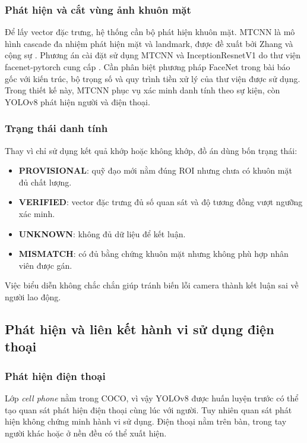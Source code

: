 \subsubsection{Phát hiện và cắt vùng ảnh khuôn mặt}
Để lấy vector đặc trưng, hệ thống cần bộ phát hiện khuôn mặt. MTCNN là mô hình cascade đa nhiệm phát hiện mặt và landmark, được đề xuất bởi Zhang và cộng sự \cite{mtcnn}. Phương án cài đặt sử dụng MTCNN và InceptionResnetV1 do thư viện facenet-pytorch cung cấp \cite{facenetpytorch}. Cần phân biệt phương pháp FaceNet trong bài báo gốc với kiến trúc, bộ trọng số và quy trình tiền xử lý của thư viện được sử dụng. Trong thiết kế này, MTCNN phục vụ xác minh danh tính theo sự kiện, còn YOLOv8 phát hiện người và điện thoại.

\subsubsection{Trạng thái danh tính}
Thay vì chỉ sử dụng kết quả khớp hoặc không khớp, đồ án dùng bốn trạng thái:
\begin{itemize}
\item \textbf{PROVISIONAL}: quỹ đạo mới nằm đúng ROI nhưng chưa có khuôn mặt đủ chất lượng.
\item \textbf{VERIFIED}: vector đặc trưng đủ số quan sát và độ tương đồng vượt ngưỡng xác minh.
\item \textbf{UNKNOWN}: không đủ dữ liệu để kết luận.
\item \textbf{MISMATCH}: có đủ bằng chứng khuôn mặt nhưng không phù hợp nhân viên được gán.
\end{itemize}
Việc biểu diễn không chắc chắn giúp tránh biến lỗi camera thành kết luận sai về người lao động.

\subsection{Phát hiện và liên kết hành vi sử dụng điện thoại}
\subsubsection{Phát hiện điện thoại}
Lớp \textit{cell phone} nằm trong COCO, vì vậy YOLOv8 được huấn luyện trước có thể tạo quan sát phát hiện điện thoại cùng lúc với người. Tuy nhiên quan sát phát hiện không chứng minh hành vi sử dụng. Điện thoại nằm trên bàn, trong tay người khác hoặc ở nền đều có thể xuất hiện.

